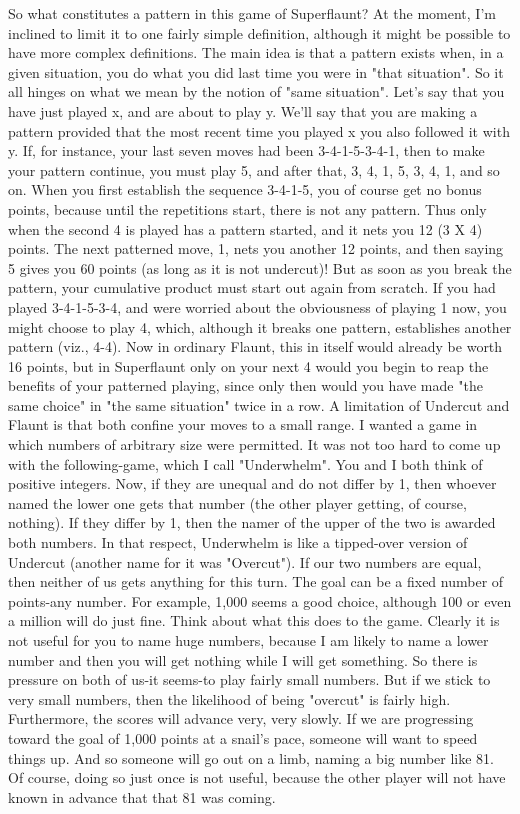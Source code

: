          So what constitutes a pattern in this game of Superflaunt? At the moment, I'm
inclined to limit it to one fairly simple definition, although it might be possible to
have more complex definitions. The main idea is that a pattern exists when, in a given
situation, you do what you did last time you were in "that situation". So it all hinges
on what we mean by the notion of "same situation". Let's say that you have just
played x, and are about to play y. We'll say that you are making a pattern provided
that the most recent time you played x you also followed it with y. If, for instance,
your last seven moves had been 3-4-1-5-3-4-1, then to make your pattern continue,
you must play 5, and after that, 3, 4, 1, 5, 3, 4, 1, and so on. When you first establish
the sequence 3-4-1-5, you of course get no bonus points, because until the repetitions
start, there is not any pattern. Thus only when the second 4 is played has a pattern
started, and it nets you 12 (3 X 4) points. The next patterned move, 1, nets you
another 12 points, and then saying 5 gives you 60 points (as long as it is not
undercut)! But as soon as you break the pattern, your cumulative product must start
out again from scratch.
         If you had played 3-4-1-5-3-4, and were worried about the obviousness of
playing 1 now, you might choose to play 4, which, although it breaks one pattern,
establishes another pattern (viz., 4-4). Now in ordinary Flaunt, this in itself would
already be worth 16 points, but in Superflaunt only on your next 4 would you begin to
reap the benefits of your patterned playing, since only then would you have made "the
same choice" in "the same situation" twice in a row.
         A limitation of Undercut and Flaunt is that both confine your moves to a small
range. I wanted a game in which numbers of arbitrary size were permitted. It was not
too hard to come up with the following-game, which I call "Underwhelm". You and I
both think of positive integers. Now, if they are unequal and do not differ by 1, then
whoever named the lower one gets that number (the other player getting, of course,
nothing). If they differ by 1, then the namer of the upper of the two is awarded both
numbers. In that respect, Underwhelm is like a tipped-over version of Undercut
(another name for it was "Overcut"). If our two numbers are equal, then neither of us
gets anything for this turn.
         The goal can be a fixed number of points-any number. For example, 1,000
seems a good choice, although 100 or even a million will do just fine. Think about
what this does to the game. Clearly it is not useful for you to name huge numbers,
because I am likely to name a lower number and then you will get nothing while I will
get something. So there is pressure on both of us-it seems-to play fairly small
numbers. But if we stick to very small numbers, then the likelihood of being "overcut"
is fairly high. Furthermore, the scores will advance very, very slowly. If we are
progressing toward the goal of 1,000 points at a snail's pace, someone will want to
speed things up. And so someone will go out on a limb, naming a big number like 81.
Of course, doing so just once is not useful, because the other player will not have
known in advance that that 81 was coming.




